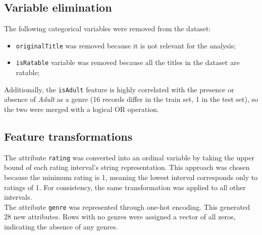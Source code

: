 \subsection{Variable elimination}\label{subsec:var_elim_discrete}
The following categorical variables were removed from the dataset:
\begin{itemize}
    \item \texttt{originalTitle} was removed because it is not relevant for the analysis;
    \item \texttt{isRatable} variable was removed because all the titles in the dataset are ratable;
\end{itemize}

Additionally, the \texttt{isAdult} feature is highly correlated with the presence or absence of
\textit{Adult} as a genre (16 records differ in the train set, 1 in the test set), so the two were merged
with a logical OR operation.


\subsection{Feature transformations}
The attribute \texttt{rating} was converted into an ordinal variable by taking the upper bound of each rating
interval's string representation. This approach was chosen because the minimum rating is 1, meaning the
lowest interval corresponds only to ratings of 1. For consistency, the same transformation was applied
to all other intervals.\\

The attribute \texttt{genre} was represented through one-hot encoding. This generated 28 new attributes.
Rows with no genres were assigned a vector of all zeros, indicating the absence of any genres.\\

